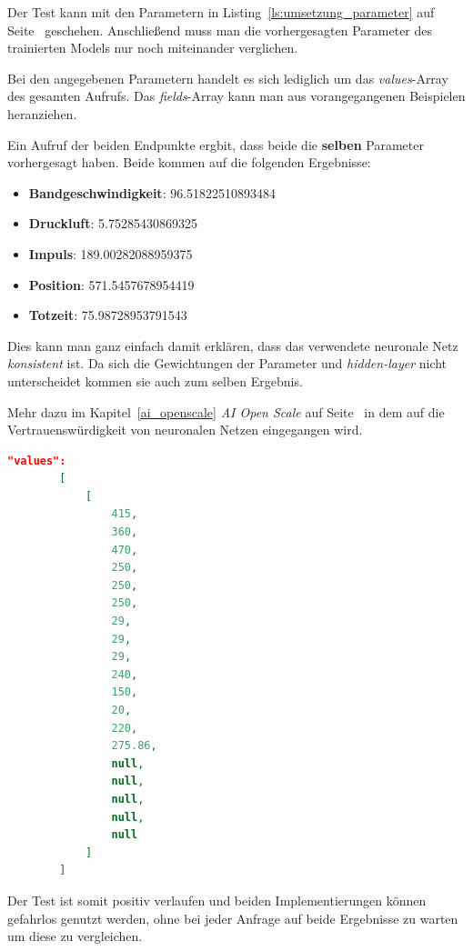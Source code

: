 Der Test kann mit den Parametern in Listing~\ref{ls:umsetzung_parameter} auf Seite~\pageref{ls:umsetzung_parameter} 
geschehen. Anschließend muss man die vorhergesagten Parameter des trainierten Models nur noch miteinander verglichen. 

Bei den angegebenen Parametern handelt es sich lediglich um das \textit{values}-Array des gesamten Aufrufs. Das 
\textit{fields}-Array kann man aus vorangegangenen Beispielen heranziehen.

Ein Aufruf der beiden Endpunkte ergbit, dass beide die \textbf{selben} Parameter vorhergesagt haben. Beide kommen auf 
die folgenden Ergebnisse:

\begin{itemize}
    \item \textbf{Bandgeschwindigkeit}: 96.51822510893484
    \item \textbf{Druckluft}: 5.75285430869325
    \item \textbf{Impuls}: 189.00282088959375
    \item \textbf{Position}: 571.5457678954419
    \item \textbf{Totzeit}: 75.98728953791543
\end{itemize}

Dies kann man ganz einfach damit erklären, dass das verwendete neuronale Netz \textit{konsistent} ist. Da sich die 
Gewichtungen der Parameter und \textit{hidden-layer} nicht unterscheidet kommen sie auch zum selben Ergebnis. 

Mehr dazu im Kapitel~\ref{ai_openscale} \textit{AI Open Scale} auf Seite~\pageref{ai_openscale} in dem auf die 
Vertrauenswürdigkeit von neuronalen Netzen eingegangen wird.

\begin{lstlisting}[language=JSON, caption=Parameter zum Test der beiden Implementierungen, label=ls:umsetzung_parameter]
    "values":
        [
            [
                415,
                360,
                470,
                250,
                250,
                250,
                29,
                29,
                29,
                240,
                150,
                20,
                220,
                275.86,
                null,
                null,
                null,
                null,
                null
            ]
        ]
\end{lstlisting}

Der Test ist somit positiv verlaufen und beiden Implementierungen können gefahrlos genutzt werden, ohne bei jeder Anfrage
auf beide Ergebnisse zu warten um diese zu vergleichen.